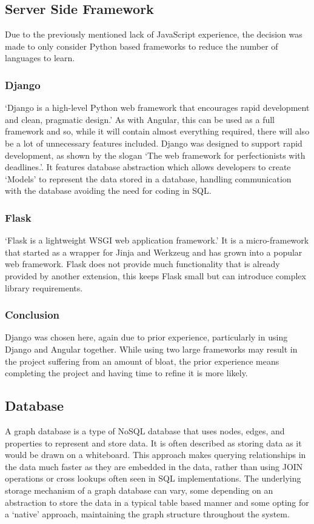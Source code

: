 \subsection{Server Side Framework}
Due to the previously mentioned lack of JavaScript experience, the decision was made to only consider Python based 
frameworks to reduce the number of languages to learn.
\subsubsection*{Django}
`Django is a high-level Python web framework that encourages rapid development and clean, pragmatic design.'\cite{Django}
As with Angular, this can be used as a full framework and so, while it will contain almost everything required, there 
will also be a lot of unnecessary features included. Django was designed to support rapid development, as shown by the 
slogan `The web framework for perfectionists with deadlines.'\cite{Django}. It features database abstraction which
 allows developers to create `Models' to represent the data stored in a database, handling communication with the 
database avoiding the need for coding in SQL.
\subsubsection*{Flask}
`Flask is a lightweight WSGI web application framework.'\cite{ronacherFlaskSimpleFramework} It is a micro-framework that
 started as a wrapper for Jinja and Werkzeug and has grown into a popular web framework. Flask does not provide much 
functionality that is already provided by another extension, this keeps Flask small but can introduce complex library 
requirements. 
\subsubsection*{Conclusion}
Django was chosen here, again due to prior experience, particularly in using Django and Angular together. While using 
two large frameworks may result in the project suffering from an amount of bloat, the prior experience means completing
 the project and having time to refine it is more likely.
\subsection{Database}
A graph database is a type of NoSQL database that uses nodes, edges, and properties to represent and store data. It is 
often described as storing data as it would be drawn on a whiteboard. This approach makes querying relationships in the 
data much faster as they are embedded in the data, rather than using JOIN operations or cross lookups often seen in SQL 
implementations. The underlying storage mechanism of a graph database can vary, some depending on an abstraction to store
 the data in a typical table based manner and some opting for a `native' approach, maintaining the graph structure 
throughout the system.
